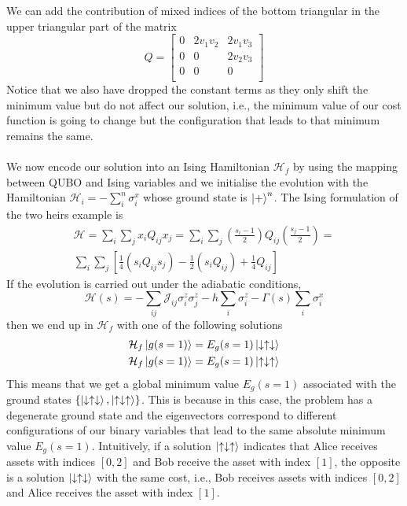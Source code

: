 We can add the contribution of mixed indices of the bottom triangular in the upper triangular part of the matrix
\begin{equation}
Q= 
    \begin{bmatrix}
           0 & 2v_{1}v_{2} & 2v_{1}v_{3}\\
           0 & 0 & 2v_{2}v_{3}\\
           0& 0 & 0\\
         \end{bmatrix}
\end{equation}
Notice that we also have dropped the constant terms as they only shift the minimum value but do not affect our solution, i.e., the minimum value of our cost function is going to change but the configuration that leads to that minimum remains the same.\\\\
We now encode our solution into an Ising Hamiltonian $\mathcal{H}_{f}$ by using the mapping between QUBO and Ising variables and we initialise the evolution with the Hamiltonian $\mathcal{H}_{i} = -\sum_{i}^{n}\sigma_{i}^{x}$ whose ground state is $\ket{+}^{n}$. The  Ising formulation of the two heirs example is
\begin{align}
\mathcal{H} = \sum_{i}\sum_{j}x_{i}Q_{ij}x_{j} = \sum_{i}\sum_{j}\left( \frac{s_{i}-1}{2}\right)Q_{ij}\left(\frac{s_{j}-1}{2}\right) = \\
\sum_{i}\sum_{j}\left[\frac{1}{4}\left(s_{i}Q_{ij}s_{j}\right) - \frac{1}{2}\left(s_{i}Q_{ij}\right) + \frac{1}{4}Q_{ij}\right]
\end{align}
If the evolution is carried out under the adiabatic conditions,
\begin{equation}
    \mathcal{H}(s) = -\sum_{ij}\mathcal{J}_{ij}\sigma_{i}^{z}\sigma_{j}^{z} - h\sum_{i}\sigma_{i}^{z} - \Gamma(s)\sum_{i}\sigma_{i}^{x}
\end{equation}
then we end up in $\mathcal{H}_{f}$ with one of the following solutions
\begin{align}
    \mathcal{H}_{f}\ket{g(s=1)} = E_{g}(s=1)\ket{\downarrow\uparrow\downarrow} \\
    \mathcal{H}_{f}\ket{g(s=1)} = E_{g}(s=1)\ket{\uparrow\downarrow\uparrow}
\end{align}
This means that we get a global minimum value $E_{g}(s=1)$ associated with the ground states $\{\ket{\downarrow\uparrow\downarrow},\ket{\uparrow\downarrow\uparrow}\}$. This is because in this case, the problem has a degenerate ground state and the eigenvectors correspond to different configurations of our binary variables that lead to the same absolute minimum value $E_{g}(s=1)$. Intuitively, if a solution $\ket{\uparrow\downarrow\uparrow}$ indicates that Alice receives assets with indices $[0,2]$ and Bob receive the asset with index $[1]$, the opposite is a solution $\ket{\downarrow\uparrow\downarrow}$ with the same cost, i.e., Bob receives assets with indices $[0,2]$ and Alice receives the asset with index $[1]$.
